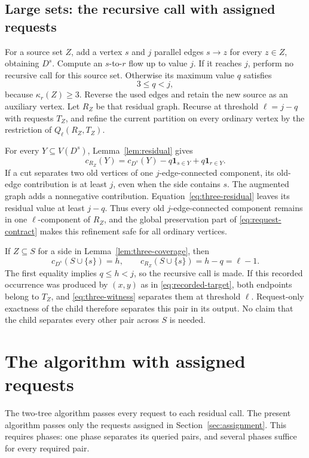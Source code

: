 \documentclass[11pt]{article}
\theoremstyle{definition}
\theoremstyle{remark}
\newcommand{\one}{\mathbf 1}
\begin{document}
\subsection{Large sets: the recursive call with assigned requests}
For a source set \(Z\), add a vertex \(s\) and \(j\) parallel edges \(s\to z\) for every \(z\in Z\), obtaining \(D^s\). Compute an \(s\)-to-\(r\) flow up to value \(j\). If it reaches \(j\), perform no recursive call for this source set. Otherwise its maximum value \(q\) satisfies
\begin{equation}
 3\le q<j,
 \label{eq:q-three}
\end{equation}
because \(\kappa_r(Z)\ge3\). Reverse the used edges and retain the new source as an auxiliary vertex. Let \(R_Z\) be that residual graph. Recurse at threshold \(\ell=j-q\) with requests \(T_Z\), and refine the current partition on every ordinary vertex by the restriction of \(Q_\ell(R_Z,T_Z)\).

For every \(Y\subseteq V(D^s)\), Lemma~\ref{lem:residual} gives
\begin{equation}
 c_{R_Z}(Y)=c_{D^s}(Y)-q\one_{s\in Y}+q\one_{r\in Y}.
 \label{eq:three-residual}
\end{equation}
If a cut separates two old vertices of one \(j\)-edge-connected component, its old-edge contribution is at least \(j\), even when the side contains \(s\). The augmented graph adds a nonnegative contribution. Equation~\eqref{eq:three-residual} leaves its residual value at least \(j-q\). Thus every old \(j\)-edge-connected component remains in one \(\ell\)-component of \(R_Z\), and the global preservation part of \eqref{eq:request-contract} makes this refinement safe for all ordinary vertices.

If \(Z\subseteq S\) for a side in Lemma~\ref{lem:three-coverage}, then
\begin{equation}
 c_{D^s}(S\cup\{s\})=h,
 \qquad
 c_{R_Z}(S\cup\{s\})=h-q=\ell-1.
 \label{eq:three-witness}
\end{equation}
The first equality implies \(q\le h<j\), so the recursive call is made. If this recorded occurrence was produced by \((x,y)\) as in \eqref{eq:recorded-target}, both endpoints belong to \(T_Z\), and \eqref{eq:three-witness} separates them at threshold \(\ell\). Request-only exactness of the child therefore separates this pair in its output. No claim that the child separates every other pair across \(S\) is needed.

\section{The algorithm with assigned requests}
\label{sec:fast}
The two-tree algorithm passes every request to each residual call. The present algorithm passes only the requests assigned in Section~\ref{sec:assignment}. This requires phases: one phase separates its queried pairs, and several phases suffice for every required pair.
\end{document}
